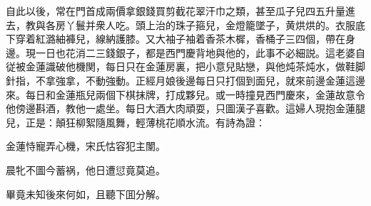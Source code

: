 自此以後，常在門首成兩價拿銀錢買剪截花翠汗巾之類，甚至瓜子兒四五升量進去，教與各房丫鬟并衆人吃。頭上治的珠子箍兒，金燈籠墜子，黄烘烘的。衣服底下穿着紅潞紬褲兒，線納護膝。又大袖子袖着香茶木樨，香桶子三四個，帶在身邊。現一日也花消二三錢銀子，都是西門慶背地與他的，此事不必細説。這老婆自従被金蓮識破他機関，每日只在金蓮房裏，把小意兒貼戀，與他炖茶炖水，做鞋脚針指，不拿強拿，不動強動。正經月娘後邊每日只打個到面兒，就來前邊金蓮這邊來。每日和金蓮瓶兒兩個下棋抹牌，打成夥兒。或一時撞見西門慶來，金蓮故意令他傍邊斟酒，教他一處坐。每日大酒大肉頑耍，只圖漢子喜歡。這婦人現抱金蓮腿兒，正是：顛狂柳絮隨風舞，輕薄桃花順水流。有詩為證：

\begin{myquote}
金蓮恃寵弄心機，宋氏怙容犯主闈。

晨牝不圖今蓄祸，他日遭愆竟莫追。
\end{myquote}

畢竟未知後來何如，且聽下囬分解。

